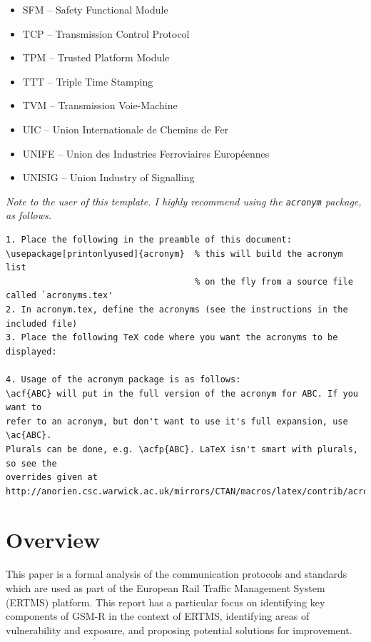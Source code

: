 \documentclass[twoside,11pt,a4paper]{article}
\renewcommand{\headrulewidth}{0pt}
\newcommand{\minitab}{\hspace*{0.25em}}
\begin{document}
\begin{itemize}[nolistsep]
\item SFM -- Safety Functional Module
\item TCP -- Transmission Control Protocol
\item TPM -- Trusted Platform Module
\item TTT -- Triple Time Stamping
\item TVM -- Transmission Voie-Machine
\item UIC -- Union Internationale de Chemins de Fer
\item UNIFE -- Union des Industries Ferroviaires Europ\'eennes
\item UNISIG -- Union Industry of Signalling
\end{itemize}

\textit{Note to the user of this template. I highly recommend using the \texttt{acronym} package, as follows.}
\begin{verbatim}
1. Place the following in the preamble of this document:
\usepackage[printonlyused]{acronym}  % this will build the acronym list
                                     % on the fly from a source file called `acronyms.tex'
2. In acronym.tex, define the acronyms (see the instructions in the included file)
3. Place the following TeX code where you want the acronyms to be displayed:

4. Usage of the acronym package is as follows:
\acf{ABC} will put in the full version of the acronym for ABC. If you want to
refer to an acronym, but don't want to use it's full expansion, use \ac{ABC}.
Plurals can be done, e.g. \acfp{ABC}. LaTeX isn't smart with plurals, so see the
overrides given at
http://anorien.csc.warwick.ac.uk/mirrors/CTAN/macros/latex/contrib/acronym/acronym.pdf

\end{verbatim}

\clearpage
\setcounter{page}{1}
\lhead{}\chead{MSc. Project Report :: \nouppercase{Section \thesection\minitab :: \leftmark}}\rhead{}
\renewcommand{\headrulewidth}{0.4pt}

\section{Overview}
This paper is a formal analysis of the communication protocols and standards which are used as part of the European Rail Traffic Management System (ERTMS) platform. This report has a particular focus on identifying key components of GSM-R in the context of ERTMS, identifying areas of vulnerability and exposure, and proposing potential solutions for improvement.
\end{document}
